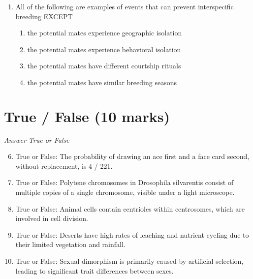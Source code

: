 \documentclass[12pt]{article}
\begin{document}
\begin{enumerate}[label=\arabic*.]
\begin{enumerate}[label=(\alph*)]
    \item Enzymatic reactions with oxygen
    \item Lactose crystallization
    \item Loss of refrigeration power over time
    \item mesophiles
    \item Natural separation of milk components without bacterial influence
\end{enumerate}
\item All of the following are examples of events that can prevent interspecific breeding EXCEPT
\begin{enumerate}[label=(\alph*)]
    \item the potential mates experience geographic isolation
    \item the potential mates experience behavioral isolation
    \item the potential mates have different courtship rituals
    \item the potential mates have similar breeding seasons
\end{enumerate}
\end{enumerate}

\section*{True / False (10 marks)}
\textit{Answer True or False}
\begin{enumerate}[label=\arabic*.]
\setcounter{enumi}{5}
\item True or False: The probability of drawing an ace first and a face card second, without replacement, is 4 / 221.
\item True or False: Polytene chromosomes in Drosophila silvarentis consist of multiple copies of a single chromosome, visible under a light microscope.
\item True or False: Animal cells contain centrioles within centrosomes, which are involved in cell division.
\item True or False: Deserts have high rates of leaching and nutrient cycling due to their limited vegetation and rainfall.
\item True or False: Sexual dimorphism is primarily caused by artificial selection, leading to significant trait differences between sexes.
\end{enumerate}
\end{document}
